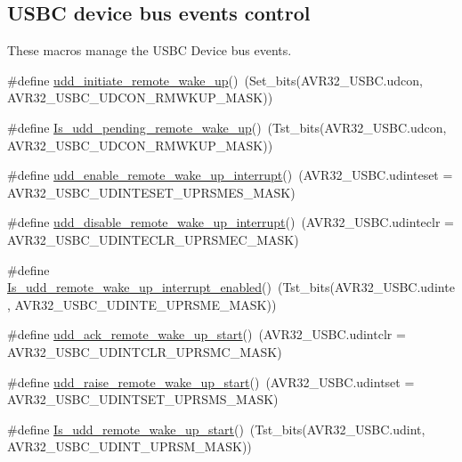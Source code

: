 \subsection*{\-U\-S\-B\-C device bus events control}
\label{_amgrp8685ab0e6929620c4e0d67ee25ea7fa9}%
 \-These macros manage the \-U\-S\-B\-C \-Device bus events. \begin{DoxyCompactItemize}
\item 
\#define \hyperlink{group__udd__group_gacc4b62140d09930dd38b10f766d30517}{udd\-\_\-initiate\-\_\-remote\-\_\-wake\-\_\-up}()~(\-Set\-\_\-bits(\-A\-V\-R32\-\_\-\-U\-S\-B\-C.\-udcon, \-A\-V\-R32\-\_\-\-U\-S\-B\-C\-\_\-\-U\-D\-C\-O\-N\-\_\-\-R\-M\-W\-K\-U\-P\-\_\-\-M\-A\-S\-K))
\item 
\#define \hyperlink{group__udd__group_gaf3dab5078ad3286ac92d7b3a8cf8933a}{\-Is\-\_\-udd\-\_\-pending\-\_\-remote\-\_\-wake\-\_\-up}()~(\-Tst\-\_\-bits(\-A\-V\-R32\-\_\-\-U\-S\-B\-C.\-udcon, \-A\-V\-R32\-\_\-\-U\-S\-B\-C\-\_\-\-U\-D\-C\-O\-N\-\_\-\-R\-M\-W\-K\-U\-P\-\_\-\-M\-A\-S\-K))
\end{DoxyCompactItemize}
\begin{DoxyCompactItemize}
\item 
\#define \hyperlink{group__udd__group_ga0f538482266ca447cbfcfb9a5eb2bd64}{udd\-\_\-enable\-\_\-remote\-\_\-wake\-\_\-up\-\_\-interrupt}()~(\-A\-V\-R32\-\_\-\-U\-S\-B\-C.\-udinteset = \-A\-V\-R32\-\_\-\-U\-S\-B\-C\-\_\-\-U\-D\-I\-N\-T\-E\-S\-E\-T\-\_\-\-U\-P\-R\-S\-M\-E\-S\-\_\-\-M\-A\-S\-K)
\item 
\#define \hyperlink{group__udd__group_gad53f9dce1280a2b17218090cde573368}{udd\-\_\-disable\-\_\-remote\-\_\-wake\-\_\-up\-\_\-interrupt}()~(\-A\-V\-R32\-\_\-\-U\-S\-B\-C.\-udinteclr = \-A\-V\-R32\-\_\-\-U\-S\-B\-C\-\_\-\-U\-D\-I\-N\-T\-E\-C\-L\-R\-\_\-\-U\-P\-R\-S\-M\-E\-C\-\_\-\-M\-A\-S\-K)
\item 
\#define \hyperlink{group__udd__group_ga2a4c5935ae7ae26e8edf63a27d3d30d9}{\-Is\-\_\-udd\-\_\-remote\-\_\-wake\-\_\-up\-\_\-interrupt\-\_\-enabled}()~(\-Tst\-\_\-bits(\-A\-V\-R32\-\_\-\-U\-S\-B\-C.\-udinte, \-A\-V\-R32\-\_\-\-U\-S\-B\-C\-\_\-\-U\-D\-I\-N\-T\-E\-\_\-\-U\-P\-R\-S\-M\-E\-\_\-\-M\-A\-S\-K))
\item 
\#define \hyperlink{group__udd__group_ga39c4b005d3194988c8969ea622eed23d}{udd\-\_\-ack\-\_\-remote\-\_\-wake\-\_\-up\-\_\-start}()~(\-A\-V\-R32\-\_\-\-U\-S\-B\-C.\-udintclr = \-A\-V\-R32\-\_\-\-U\-S\-B\-C\-\_\-\-U\-D\-I\-N\-T\-C\-L\-R\-\_\-\-U\-P\-R\-S\-M\-C\-\_\-\-M\-A\-S\-K)
\item 
\#define \hyperlink{group__udd__group_ga8e9d45e299d7a26b65bf8a98c8e27546}{udd\-\_\-raise\-\_\-remote\-\_\-wake\-\_\-up\-\_\-start}()~(\-A\-V\-R32\-\_\-\-U\-S\-B\-C.\-udintset = \-A\-V\-R32\-\_\-\-U\-S\-B\-C\-\_\-\-U\-D\-I\-N\-T\-S\-E\-T\-\_\-\-U\-P\-R\-S\-M\-S\-\_\-\-M\-A\-S\-K)
\item 
\#define \hyperlink{group__udd__group_gacfe73866ea62b418fe69fa061ef6edd3}{\-Is\-\_\-udd\-\_\-remote\-\_\-wake\-\_\-up\-\_\-start}()~(\-Tst\-\_\-bits(\-A\-V\-R32\-\_\-\-U\-S\-B\-C.\-udint, \-A\-V\-R32\-\_\-\-U\-S\-B\-C\-\_\-\-U\-D\-I\-N\-T\-\_\-\-U\-P\-R\-S\-M\-\_\-\-M\-A\-S\-K))
\end{DoxyCompactItemize}

